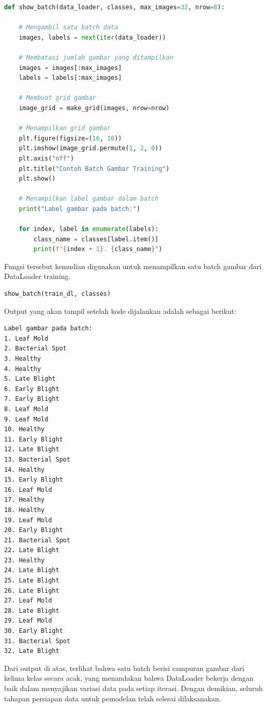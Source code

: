 \begin{lstlisting}[language=Python, caption=Membuat fungsi untuk menampilkan batch gambar]
def show_batch(data_loader, classes, max_images=32, nrow=8):

    # Mengambil satu batch data
    images, labels = next(iter(data_loader))

    # Membatasi jumlah gambar yang ditampilkan
    images = images[:max_images]
    labels = labels[:max_images]

    # Membuat grid gambar
    image_grid = make_grid(images, nrow=nrow)

    # Menampilkan grid gambar
    plt.figure(figsize=(16, 16))
    plt.imshow(image_grid.permute(1, 2, 0))
    plt.axis("off")
    plt.title("Contoh Batch Gambar Training")
    plt.show()

    # Menampilkan label gambar dalam batch
    print("Label gambar pada batch:")

    for index, label in enumerate(labels):
        class_name = classes[label.item()]
        print(f"{index + 1}. {class_name}")
\end{lstlisting}

Fungsi tersebut kemudian digunakan untuk menampilkan satu batch gambar dari DataLoader training.

\begin{lstlisting}[language=Python, caption=Menampilkan batch gambar training]
show_batch(train_dl, classes)
\end{lstlisting}

Output yang akan tampil setelah kode dijalankan adalah sebagai berikut:

\begin{outputcode}[H]
\begin{lstlisting}[language={}]
Label gambar pada batch:
1. Leaf Mold
2. Bacterial Spot
3. Healthy
4. Healthy
5. Late Blight
6. Early Blight
7. Early Blight
8. Leaf Mold
9. Leaf Mold
10. Healthy
11. Early Blight
12. Late Blight
13. Bacterial Spot
14. Healthy
15. Early Blight
16. Leaf Mold
17. Healthy
18. Healthy
19. Leaf Mold
20. Early Blight
21. Bacterial Spot
22. Late Blight
23. Healthy
24. Late Blight
25. Late Blight
26. Late Blight
27. Leaf Mold
28. Late Blight
29. Leaf Mold
30. Early Blight
31. Bacterial Spot
32. Late Blight
\end{lstlisting}
\caption{Output batch gambar training}
\end{outputcode}

Dari output di atas, terlihat bahwa satu batch berisi campuran gambar dari kelima kelas secara acak, yang menandakan bahwa DataLoader bekerja dengan baik dalam menyajikan variasi data pada setiap iterasi. Dengan demikian, seluruh tahapan persiapan data untuk pemodelan telah selesai dilaksanakan.

